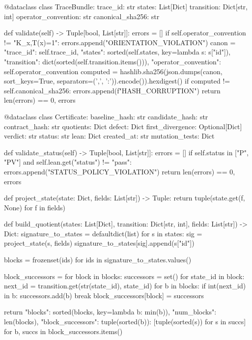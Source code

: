 @dataclass  
class TraceBundle:
    trace_id: str
    states: List[Dict]
    transition: Dict[str, int]
    operator_convention: str
    canonical_sha256: str
    
    def validate(self) -> Tuple[bool, List[str]]:
        errors = []
        if self.operator_convention != "K_x,T(x)=1":
            errors.append("ORIENTATION_VIOLATION")
        canon = {
            "trace_id": self.trace_id,
            "states": sorted(self.states, key=lambda s: s["id"]),
            "transition": dict(sorted(self.transition.items())),
            "operator_convention": self.operator_convention
        }
        computed = hashlib.sha256(json.dumps(canon, sort_keys=True, separators=(',', ':')).encode()).hexdigest()
        if computed != self.canonical_sha256:
            errors.append(f"HASH_CORRUPTION")
        return len(errors) == 0, errors

@dataclass
class Certificate:
    baseline_hash: str
    candidate_hash: str
    contract_hash: str
    quotients: Dict
    defect: Dict
    first_divergence: Optional[Dict]
    verdict: str
    status: str
    lean: Dict
    created_at: str
    mutation_tests: Dict
    
    def validate_status(self) -> Tuple[bool, List[str]]:
        errors = []
        if self.status in ["P", "PV"] and self.lean.get("status") != "pass":
            errors.append("STATUS_POLICY_VIOLATION")
        return len(errors) == 0, errors

def project_state(state: Dict, fields: List[str]) -> Tuple:
    return tuple(state.get(f, None) for f in fields)

def build_quotient(states: List[Dict], transition: Dict[str, int], fields: List[str]) -> Dict:
    signature_to_states = defaultdict(list)
    for s in states:
        sig = project_state(s, fields)
        signature_to_states[sig].append(s["id"])
    
    blocks = {frozenset(ids) for ids in signature_to_states.values()}
    
    block_successors = {}
    for block in blocks:
        successors = set()
        for state_id in block:
            next_id = transition.get(str(state_id), state_id)
            for b in blocks:
                if int(next_id) in b:
                    successors.add(b)
                    break
        block_successors[block] = successors
    
    return {
        "blocks": sorted(blocks, key=lambda b: min(b)),
        "num_blocks": len(blocks),
        "block_successors": {tuple(sorted(b)): [tuple(sorted(s)) for s in succs] 
                              for b, succs in block_successors.items()}
    }

